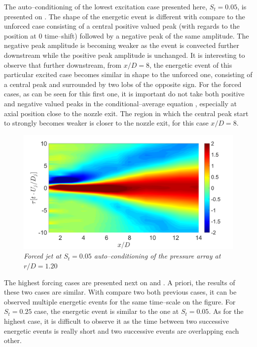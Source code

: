 The auto--conditioning of the lowest excitation case presented here, $S_t = 0.05$, is presented on .
The shape of the energetic event is different with compare to the unforced case consisting of a central positive valued peak (with regards to the position at $0$ time--shift) followed by a negative peak of the same amplitude.
The negative peak amplitude is becoming weaker as the event is convected further downstream while the positive peak amplitude is unchanged.
It is interesting to observe that further downstream, from $x/D=8$, the energetic event of this particular excited case becomes similar in shape to the unforced one, consisting of a central peak and surrounded by two lobs of the opposite sign.
For the forced cases, as can be seen for this first one, it is important do not take both positive and negative valued peaks in the conditional--average equation , especially at axial position close to the nozzle exit.
The region in which the central peak start to strongly becomes weaker is closer to the nozzle exit, for this case $x/D = 8$. 

\begin{figure}
	\centering
	\includegraphics[width=1\textwidth]{Figures/conditioning/autoCondSt0p05.png}
	\caption{\textit{Forced jet at $S_t = 0.05$ auto--conditioning of the pressure array at $r/D = 1.20$}}
	\label{fig:autoCondSt0p05}
\end{figure}

The highest forcing cases are presented next on  and .
A priori, the results of these two cases are similar.
With compare two both previous cases, it can be observed multiple energetic events for the same time--scale on the figure.
For $S_t = 0.25$ case, the energetic event is similar to the one at $S_t = 0.05$.
As for the highest case, it is difficult to observe it as the time between two successive energetic events is really short and two successive events are overlapping each other. 

